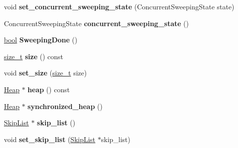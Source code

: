 \begin{DoxyCompactItemize}
void {\bfseries set\+\_\+concurrent\+\_\+sweeping\+\_\+state} (Concurrent\+Sweeping\+State state)
\item 
\mbox{\label{classv8_1_1internal_1_1MemoryChunk_a9a541660013b35e9820900f544df8e38}} 
Concurrent\+Sweeping\+State {\bfseries concurrent\+\_\+sweeping\+\_\+state} ()
\item 
\mbox{\label{classv8_1_1internal_1_1MemoryChunk_ac0373601c2172254ad8381ea0e45e1f0}} 
\mbox{\hyperlink{classbool}{bool}} {\bfseries Sweeping\+Done} ()
\item 
\mbox{\label{classv8_1_1internal_1_1MemoryChunk_af6c9a900ce81987b2749508d55676437}} 
\mbox{\hyperlink{classsize__t}{size\+\_\+t}} {\bfseries size} () const
\item 
\mbox{\label{classv8_1_1internal_1_1MemoryChunk_aca1b8c21e6cb795a4c2613a9508ac64e}} 
void {\bfseries set\+\_\+size} (\mbox{\hyperlink{classsize__t}{size\+\_\+t}} size)
\item 
\mbox{\label{classv8_1_1internal_1_1MemoryChunk_a121d41b51c6284f90fcadbdeed480b64}} 
\mbox{\hyperlink{classv8_1_1internal_1_1Heap}{Heap}} $\ast$ {\bfseries heap} () const
\item 
\mbox{\label{classv8_1_1internal_1_1MemoryChunk_af72eda68fcd5eb76fd67561f214de33e}} 
\mbox{\hyperlink{classv8_1_1internal_1_1Heap}{Heap}} $\ast$ {\bfseries synchronized\+\_\+heap} ()
\item 
\mbox{\label{classv8_1_1internal_1_1MemoryChunk_a07fa46d9e099b97dd2be1b9b35b9750a}} 
\mbox{\hyperlink{classv8_1_1internal_1_1SkipList}{Skip\+List}} $\ast$ {\bfseries skip\+\_\+list} ()
\item 
\mbox{\label{classv8_1_1internal_1_1MemoryChunk_abc9c19c1cc451e69db7ee628707b6047}} 
void {\bfseries set\+\_\+skip\+\_\+list} (\mbox{\hyperlink{classv8_1_1internal_1_1SkipList}{Skip\+List}} $\ast$skip\+\_\+list)
\item 
\mbox{\label{classv8_1_1internal_1_1MemoryChunk_a2d2736ba7668ce54255a4b6604a95a5d}} 

\end{DoxyCompactItemize}
